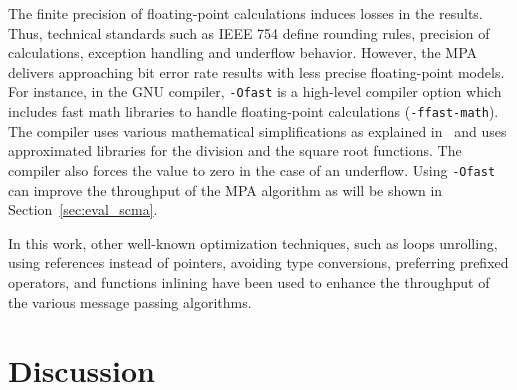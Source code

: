The finite precision of floating-point calculations induces losses in the
results. Thus, technical standards such as IEEE 754 define rounding rules,
precision of calculations, exception handling and underflow behavior. However,
the MPA delivers approaching bit error rate results with less precise
floating-point models. For instance, in the GNU compiler, \verb|-Ofast| is a
high-level compiler option which includes fast math libraries to handle
floating-point calculations (\verb|-ffast-math|). The compiler uses various
mathematical simplifications as explained in~\cite{Gccfp2018} and uses
approximated libraries for the division and the square root functions. The
compiler also forces the value to zero in the case of an underflow. Using
\verb|-Ofast| can improve the throughput of the MPA algorithm as will be shown
in Section~\ref{sec:eval_scma}.

In this work, other well-known optimization techniques, such as loops unrolling,
using references instead of pointers, avoiding type conversions, preferring
prefixed operators, and functions inlining have been used to enhance the
throughput of the various message passing algorithms.

\section{Discussion}
